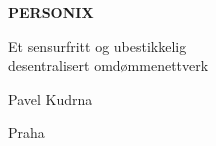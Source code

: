 \thispagestyle{empty}
\begin{center}
  {\sffamily\bfseries\fontsize{34}{40}\selectfont PERSONIX\par}
  \vspace{2.2em}
  {\rmfamily\large Et sensurfritt og ubestikkelig\\[0.25em]
   desentralisert omdømmenettverk\par}
\end{center}
\begin{center}
  {\rmfamily\Large Pavel Kudrna\par}
  \vspace{0.45em}
  {\rmfamily\small Praha\quad\textbullet{}\par}
\end{center}
\clearpage
